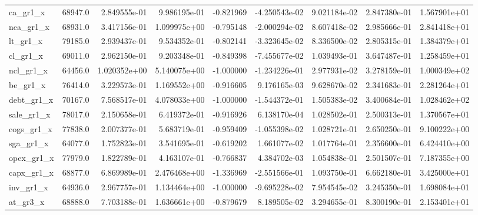\documentclass[10pt]{article}
\begin{document}
\begin{landscape}
\begin{longtable}{lrrrrrrrr}
ca\_gr1\_x                &   68947.0 &  2.849555e-01 &  9.986195e-01 &     -0.821969 & -4.250543e-02 &  9.021184e-02 &  2.847380e-01 &  1.567901e+01 \\
nca\_gr1\_x               &   68931.0 &  3.417156e-01 &  1.099975e+00 &     -0.795148 & -2.000294e-02 &  8.607418e-02 &  2.985666e-01 &  2.841418e+01 \\
lt\_gr1\_x                &   79185.0 &  2.939437e-01 &  9.534352e-01 &     -0.802141 & -3.323645e-02 &  8.336500e-02 &  2.805315e-01 &  1.384379e+01 \\
cl\_gr1\_x                &   69011.0 &  2.962150e-01 &  9.203348e-01 &     -0.849398 & -7.455677e-02 &  1.039493e-01 &  3.647487e-01 &  1.258459e+01 \\
ncl\_gr1\_x               &   64456.0 &  1.020352e+00 &  5.140075e+00 &     -1.000000 & -1.234226e-01 &  2.977931e-02 &  3.278159e-01 &  1.000349e+02 \\
be\_gr1\_x                &   76414.0 &  3.229573e-01 &  1.169552e+00 &     -0.916605 &  9.176165e-03 &  9.628670e-02 &  2.341683e-01 &  2.281264e+01 \\
debt\_gr1\_x              &   70167.0 &  7.568517e-01 &  4.078033e+00 &     -1.000000 & -1.544372e-01 &  1.505383e-02 &  3.400684e-01 &  1.028462e+02 \\
sale\_gr1\_x              &   78017.0 &  2.150658e-01 &  6.419372e-01 &     -0.916926 &  6.138170e-04 &  1.028502e-01 &  2.500313e-01 &  1.370567e+01 \\
cogs\_gr1\_x              &   77838.0 &  2.007377e-01 &  5.683719e-01 &     -0.959409 & -1.055398e-02 &  1.028721e-01 &  2.650250e-01 &  9.100222e+00 \\
sga\_gr1\_x               &   64077.0 &  1.752823e-01 &  3.541695e-01 &     -0.619202 &  1.661077e-02 &  1.017764e-01 &  2.356600e-01 &  6.424410e+00 \\
opex\_gr1\_x              &   77979.0 &  1.822789e-01 &  4.163107e-01 &     -0.766837 &  4.384702e-03 &  1.054838e-01 &  2.501507e-01 &  7.187355e+00 \\
capx\_gr1\_x              &   68877.0 &  6.869989e-01 &  2.476468e+00 &     -1.336969 & -2.551566e-01 &  1.093750e-01 &  6.662180e-01 &  3.425000e+01 \\
inv\_gr1\_x               &   64936.0 &  2.967757e-01 &  1.134464e+00 &     -1.000000 & -9.695228e-02 &  7.954545e-02 &  3.245350e-01 &  1.698084e+01 \\
at\_gr3\_x                &   68888.0 &  7.703188e-01 &  1.636661e+00 &     -0.879679 &  8.189505e-02 &  3.294655e-01 &  8.300190e-01 &  2.153401e+01 \\

\end{longtable}
\end{landscape}
\end{document}
